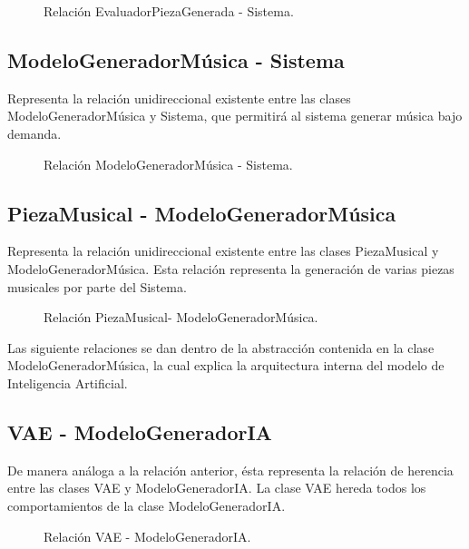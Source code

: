\begin{figure}[H]
  \centering
  
  \caption{Relación EvaluadorPiezaGenerada - Sistema.}
\end{figure}

\subsection{ModeloGeneradorMúsica - Sistema}

Representa la relación unidireccional existente entre las clases ModeloGeneradorMúsica y Sistema, que permitirá al sistema generar música bajo demanda.

\begin{figure}[H]
  \centering
  
  \caption{Relación ModeloGeneradorMúsica - Sistema.}
\end{figure}

\subsection{PiezaMusical - ModeloGeneradorMúsica}

Representa la relación unidireccional existente entre las clases PiezaMusical y ModeloGeneradorMúsica. Esta relación representa la generación de varias piezas musicales por parte del Sistema.

\begin{figure}[H]
  \centering
  
  \caption{Relación PiezaMusical- ModeloGeneradorMúsica.}
\end{figure}

Las siguiente relaciones se dan dentro de la abstracción contenida en la clase ModeloGeneradorMúsica, la cual explica la arquitectura interna del modelo de Inteligencia Artificial.

\subsection{VAE - ModeloGeneradorIA}

De manera análoga a la relación anterior, ésta representa la relación de herencia entre las clases VAE y ModeloGeneradorIA. La clase VAE hereda todos los comportamientos de la clase ModeloGeneradorIA.

\begin{figure}[H]
  \centering
  
  \caption{Relación VAE - ModeloGeneradorIA.}
\end{figure}


